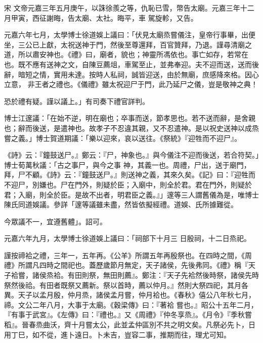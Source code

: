 
\begin{pinyinscope}

 宋
 文帝元嘉三年五月庚午，以誅徐羨之等，仇恥已雪，幣告太廟。元嘉三年十二月甲寅，西征謝晦，告太廟、太社。晦平，車
 駕旋軫，又告。



 元嘉六年七月，太學博士徐道娛上議曰：「伏見太廟烝嘗儀注，皇帝行事畢，出便坐，三公已上獻，太祝送神于門，然後至尊還拜，百官贊拜，乃退。謹尋清廟之道，所以肅安神也。《禮》曰，廟者，貌也；神靈所馮依也。事亡如存，若常在也。既不應有送神之文，自陳豆薦俎，車駕至止，並弗奉迎。夫不迎而送，送而後辭，暗短之情，實用未達。按時人私祠，誠皆迎送，由於無廟，庶感降來格。因心立意，
 非王者之禮也。《儀禮》雖太祝迎尸于門，此乃延尸之儀，豈是敬神之典！



 恐於禮有疑。謹以議上。」有司奏下禮官詳判。



 博士江邃議：「在始不逆，明在廟也；卒事而送，節孝思也。若不送而辭，是舍親也；辭而後送，是遣神也。故孝子不忍違其親，又不忍遣神。是以祝史送神以成烝嘗之義。」博士賀道期議：「樂以迎來，哀以送往。《祭統》『迎牲而不迎尸』。



 《詩》云：『鐘鼓送尸。』鄭云：『尸，神象也。』與今儀注不迎而後送，若合符契。」博士荀萬秋議：「古之事尸，與今之事
 神，其義一也。周禮，尸出，送于廟門，拜，尸不顧。《詩》云：『鐘鼓送尸。』則送神之義，其來久矣。《記》曰：『迎牲而不迎尸，別嫌也。尸在門外，則疑於臣；入廟中，則全於君。君在門外，則疑於君；入廟，則全於臣。是故不出者，明君臣之義。』」邃等三人謂舊儀為是，唯博士陳氏同道娛議。參詳「邃等議雖未盡，然皆依擬經禮。道娛、氏所據難從。



 今眾議不一，宜遵舊體」。詔可。



 元嘉六年九月，太學博士徐道娛上議曰：「祠部下十月三
 日殷祠，十二日烝祀。



 謹按禘袷之禮，三年一，五年再。《公羊》所謂五年再殷祭也。在四時之間，《周禮》所謂凡四時之間祀也。蓋歷歲節月無定，天子諸侯，先後弗同。《禮》稱『天子袷嘗，諸侯烝袷。有田則祭，無田則薦』。鄭注：『天子先袷然後時祭，諸侯先時祭然後祫。有田者既祭又薦新。祭以首時，薦以仲月。』然則大祭四祀，其月各異。天子以孟月殷，仲月烝，諸侯孟月嘗，仲月袷也。《春秋》僖公八年秋七月，禘。文公二年八月，大事于太廟。《穀梁傳》曰：『著袷
 嘗也。』昭公十五年二月，『有事于武宮』。《左傳》曰：『禮也。』又《周禮》『仲冬享烝』。《月令》『季秋嘗稻』。晉春烝曲沃，齊十月嘗太公，此並孟仲區別不共之明文矣。凡祭必先卜，日用丁巳，如不從，進卜遠日。卜未吉，豈容二事，推期而往，理尤可知。




\end{pinyinscope}
